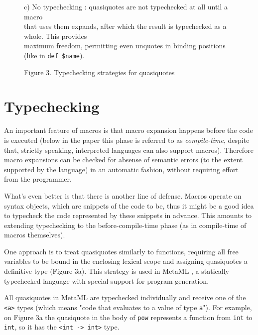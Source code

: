 \documentclass[10pt,journal,a4paper]{IEEEtran}
\begin{document}
\begin{figure*}[t]
\begin{listing}
\begin{adjustwidth}{2.5cm}{0pt}
c) No typechecking \cite{skalski05, skalski04}: quasiquotes are not typechecked at all until a
macro\\ that uses them expands, after which the result is typechecked as a whole. This provides\\
maximum freedom, permitting even unquotes in binding positions
(like in \small \texttt{def \$name}\normalsize).
\end{adjustwidth}

\end{listing}
\end{figure*}

\begin{figure*}
\hskip5.48cm
\normalsize Figure 3. Typechecking strategies for quasiquotes
\end{figure*}

\section{Typechecking}

An important feature of macros is that macro expansion happens before the code is executed (below in
the paper this phase is referred to as \emph{compile-time}, despite that, strictly speaking, interpreted
languages can also support macros). Therefore macro expansions can be checked for
absense of semantic errors (to the extent supported by the language) in an automatic fashion,
without requiring effort from the programmer.

What's even better is that there is another line of defense.
Macros operate on syntax objects, which are snippets of the code to be,
thus it might be a good idea to typecheck the code represented by these snippets
in advance. This amounts to extending typechecking to the before-compile-time phase
(as in compile-time of macros themselves).

One approach is to treat quasiquotes similarly to functions, requiring all free variables
to be bound in the enclosing lexical scope and assigning quasiquotes a definitive type (Figure 3a).
This strategy is used in MetaML \cite{taha99}, a statically typechecked
language with special support for program generation.

All quasiquotes in MetaML are typechecked individually
and receive one of the \small \texttt{<a>} \normalsize
types (which means "code that evaluates to a value of type \small \texttt{a}\normalsize").
For example, on Figure 3a the quasiquote in the body of \small \texttt{pow} \normalsize
represents a function from \small \texttt{int} \normalsize to \small \texttt{int}\normalsize, so it has the
\small \texttt{<int -> int>} \normalsize type.
\end{document}
